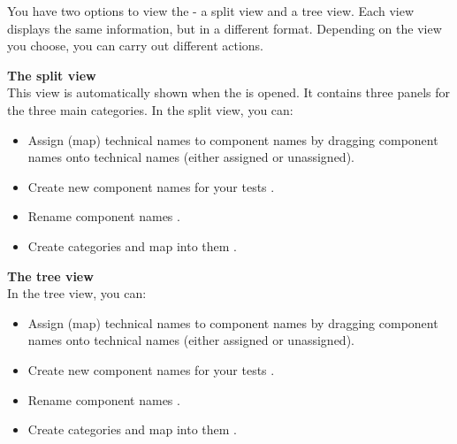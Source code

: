 
You have two options to view the \gdomeditor{} - a split view and a tree view. Each view displays the same information, but in a different format. Depending on the view you choose, you can carry out different actions.  

\textbf{The split view}\\
This view is automatically shown when the \gdomeditor{} is opened. It contains three panels for the three main categories. In the split view, you can:
\begin{itemize}
\item Assign (map) technical names to component names  by dragging component names onto technical names (either assigned or unassigned). 
\item Create new component names for your tests .
\item Rename component names . 
\item Create categories and map into them .
\end{itemize}

\textbf{The tree view}\\
In the tree view, you can:
\begin{itemize}
\item Assign (map) technical names to component names  by dragging component names onto technical names (either assigned or unassigned). 
\item Create new component names for your tests .
\item Rename component names . 
\item Create categories and map into them .
\end{itemize}
